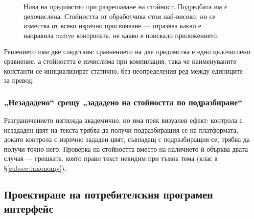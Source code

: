\begin{figure}[H]
\centering
{}
\caption{Нива на предимство при разрешаване на стойност. Подредбата им \emph{е}
целочислена. Стойността от обработчика стои най-високо, но се измества от всяко изрично
присвояване --- отразява какво е направила native контролата, не какво е поискало
приложението.}
\label{fig:precedence}
\end{figure}

Решението има две следствия: сравнението на две предимства е едно целочислено сравнение, а
стойността е изчислима при компилация, така че наименуваните константи се инициализират
статично, без неопределения ред между единиците за превод.

\subsubsection{„Незададено“ срещу „зададено на стойността по подразбиране“}

Разграничението изглежда академично, но има пряк визуален ефект: контрола с незададен цвят
на текста трябва да получи
подразбиращия се на платформата, докато контрола с изрично зададен цвят, съвпадащ с
подразбиращия се, трябва да получи точно него. Проверка на стойността вместо на наличието
ѝ обърква двата случая --- грешката, която прави текст невидим при тъмна тема (клас в
§\ref{subsec:taxonomy}).

\subsection{Проектиране на потребителския програмен интерфейс}
\label{subsec:api_design}

